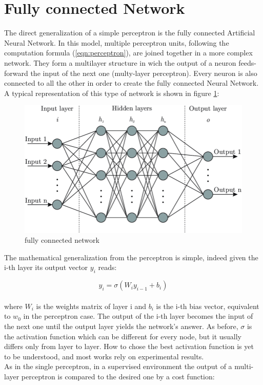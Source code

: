 \documentclass[a4paper, 10pt]{book}
\begin{document}
\section{Fully connected Network}

The direct generalization of a simple perceptron is the fully connected Artificial Neural Network. In this model, multiple perceptron units, following the computation formula (\ref{eqn:perceptron}), are joined together in a more complex  network. 
They form a multilayer structure in wich the output of a neuron feeds-forward the input of the next one (multy-layer perceptron). 
Every neuron is  also connected to all the other in order to create the fully connected Neural Network.
A typical representation of this type of network is shown in figure \ref{fgr:neural_net}:

\begin{figure}[htp]
    \centering
    \includegraphics[width=12cm]{neural_net.png}
    \caption{fully connected network}
    \label{fgr:neural_net}
\end{figure}


The mathematical generalization from the perceptron is simple, indeed given the i-th layer its output vector $y_i$ reads:

\begin{equation}
    \label{eqn:fully_conncect}
{y_i = \sigma (W_i y_{i-1}+ b_i) }  
\end{equation}
\\
where $ W_i$ is the weights matrix of layer i and $b_i$ is the i-th bias vector, equivalent to $w_0$ in the perceptron case. The output of the i-th layer becomes the input of the next one until the output layer yields the network's answer.
As before, $\sigma$ is the activation function which can be different for every node, but it usually differs only from layer to layer. How to chose the best activation function is yet to be understood, and most works rely on experimental results.
\\
As in the single perceptron, in a supervised environment the output of a multi-layer perceptron is compared to the desired one by a cost function:
\end{document}
